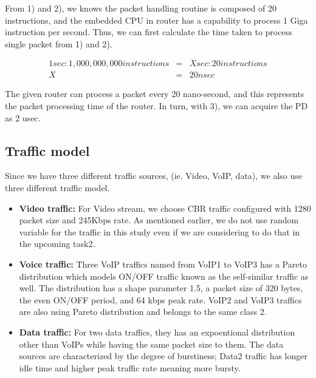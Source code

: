 \documentclass[letterpaper, 10 pt, conference]{ieeeconf}  %
\begin{document}
From 1) and 2), we knows the packet handling routine is composed of 20
instructions, and the embedded CPU in router has a capability to process 1 Giga instruction per second. 
Thus, we can first calculate the time taken to process single packet from 1)
and 2). 

\begin{eqnarray}
1{sec}: 1,000,000,000 {instructions} & = & X {sec} : 20 {instructions}\nonumber \\
X & = & 20 {nsec}\nonumber               
\label{eqn:proctime}
\end{eqnarray}

The given router can process a packet every 20 nano-second, and this represents the packet processing time of the router. 
In turn, with 3), we can acquire the PD as 2 usec. 

\subsection{\bf{Traffic model}}
\label{sec:configuration}
\noindent 
Since we have three different traffic sources, (ie. Video, VoIP, data), we also
use three different traffic model.

\begin{itemize}
\item {\bf Video traffic:}
For Video stream, we choose CBR traffic
configured with 1280 packet size and 245Kbps rate. As mentioned earlier, we do
not use random variable for the traffic in this study even if we are
considering to do that in the upcoming task2.

\item {\bf Voice traffic:}
Three VoIP traffics named from VoIP1 to VoIP3 has a Pareto distribution which
models ON/OFF traffic known as the self-similar traffic as well. The
distribution has a shape parameter 1.5, a packet size of 320 bytes, the even
ON/OFF period, and 64 kbps peak rate. VoIP2 and VoIP3 traffics are also using
Pareto distribution and belongs to the same class 2. 

\item {\bf Data traffic:}
For two data traffics, they has an expoentional distribution other than VoIPs
while having the same packet size to them. The data sources are characterized
by the degree of burstiness; Data2 traffic has longer idle time and higher peak
traffic rate meaning more bursty.
\end{itemize}
\end{document}
